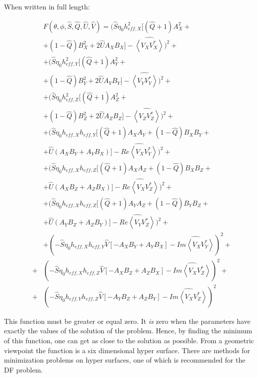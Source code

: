 \documentclass[a4paper,14pt]{extbook}
\begin{document}
\newpage

When written in full length:

\begin{eqnarray}
&&F(\theta , \phi, \hat{S},\hat{Q},\hat{U},\hat{V})=(\hat{S}\eta_0 h_{eff,X}^2[(\hat{Q}+1) A^2_X + \\
&&+(1-\hat{Q}) B^2_X+ 2 \hat{U}A_X B_X]  - \widehat{\left\langle V_X V_X^{*} \right\rangle})^2+\nonumber \\
&&+(\hat{S}\eta_0 h_{eff,Y}^2[(\hat{Q}+1) A^2_Y + \nonumber \\
&&+(1-\hat{Q}) B^2_Y + 2 \hat{U}A_Y B_Y]  - \widehat{\left\langle V_Y V_Y^{*} \right\rangle})^2 +\nonumber \\
&&+(\hat{S}\eta_0 h_{eff,Z}^2[(\hat{Q}+1) A^2_Z +\nonumber \\
&&+ (1-\hat{Q}) B^2_Z+ 2 \hat{U}A_Z B_Z]  - \widehat{\left\langle V_Z V_Z^{*} \right\rangle})^2 +\nonumber \\
&&+(\hat{S}\eta_0 h_{eff,X} h_{eff,Y}[(\hat{Q}+1) A_X A_Y + (1-\hat{Q}) B_X B_Y  +\nonumber \\
&&+  \hat{U} (A_X B_Y + A_Y B_X)] - \widehat{Re\left\langle V_X V_Y^{*} \right\rangle})^2 +\nonumber \\
&&+(\hat{S}\eta_0 h_{eff,X} h_{eff,Z}[(\hat{Q}+1) A_X A_Z + (1-\hat{Q}) B_X B_Z  +\nonumber \\
&&+  \hat{U} (A_X B_Z + A_Z B_X)] - \widehat{Re\left\langle V_X V_Z^{*} \right\rangle})^2 +\nonumber \\
&&+(\hat{S}\eta_0 h_{eff,X} h_{eff,Z}[(\hat{Q}+1) A_Y A_Z + (1-\hat{Q}) B_Y B_Z  +\nonumber \\
&&+  \hat{U} (A_Y B_Z + A_Z B_Y)] - \widehat{Re\left\langle V_Y V_Z^{*} \right\rangle})^2 +\nonumber \\
&&+(-\hat{S}\eta_0 h_{eff,X} h_{eff,Y} \hat{V}[-A_X B_Y + A_Y B_X ] - \widehat{Im\left\langle V_X V_Y^{*} \right\rangle})^2 +\nonumber \\
&+&(-\hat{S}\eta_0 h_{eff,X} h_{eff,Z} \hat{V}[-A_X B_Z + A_Z B_X ] - \widehat{Im\left\langle V_X V_Z^{*} \right\rangle})^2+ \nonumber\\
&+&(-\hat{S}\eta_0 h_{eff,Y} h_{eff,Z} \hat{V}[-A_Y B_Z + A_Z B_Y ] - \widehat{Im\left\langle V_X V_Z^{*} \right\rangle})^2 \nonumber
\end{eqnarray}


This function must be greater or equal zero. It \emph{is} zero when the parameters have exactly the values of the solution of the problem. Hence, by finding the minimum of this function, one can get as close to the solution as possible. From a geometric viewpoint the function is a six dimensional hyper surface. There are methods for minimization problems on hyper surfaces, one of which is recommended for the DF problem.
\end{document}
